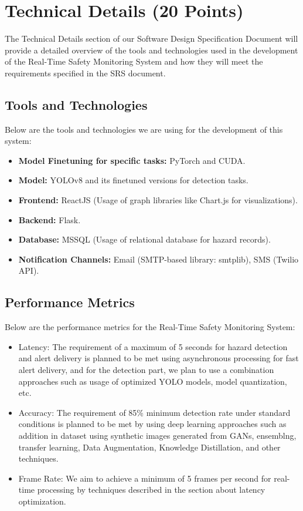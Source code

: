\documentclass[12pt]{article}
\begin{document}
\section{Technical Details (20 Points)}
The Technical Details section of our Software Design Specification Document 
will provide a detailed overview of the tools and technologies used in the 
development of the Real-Time Safety Monitoring System and how they will meet 
the requirements specified in the SRS document.
\subsection{Tools and Technologies}
Below are the tools and technologies we are using for the development of this system:
\begin{itemize}
    \item \textbf{Model Finetuning for specific tasks:} PyTorch and CUDA.
    \item \textbf{Model:} YOLOv8 and its finetuned versions for detection tasks.
    \item \textbf{Frontend:} ReactJS (Usage of graph libraries like Chart.js for visualizations).
    \item \textbf{Backend:} Flask.
    \item \textbf{Database:} MSSQL (Usage of relational database for hazard records).
    \item \textbf{Notification Channels:} Email (SMTP-based library: smtplib), SMS (Twilio API).
\end{itemize}

\subsection{Performance Metrics}
Below are the performance metrics for the Real-Time Safety Monitoring System:
\begin{itemize}
    \item Latency: The requirement of a maximum of 5 seconds for hazard detection and alert delivery is planned to be met using asynchronous processing for fast alert delivery, and for the detection part, we plan to use a combination approaches such as usage of optimized YOLO models, model quantization, etc.
    \item Accuracy: The requirement of 85\% minimum detection rate under standard conditions is planned to be met by using deep learning approaches such as addition in dataset using synthetic images generated from GANs, ensemblng, transfer learning, Data Augmentation, Knowledge Distillation, and other techniques.
    \item Frame Rate: We aim to achieve a minimum of 5 frames per second for real-time processing by techniques described in the section about latency optimization.
\end{itemize}
\end{document}
